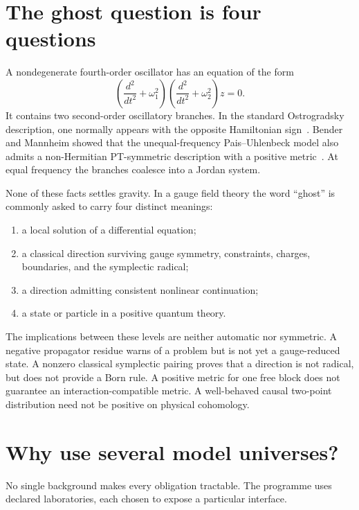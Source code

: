 \documentclass[11pt]{article}
\begin{document}
\section{The ghost question is four questions}

A nondegenerate fourth-order oscillator has an equation of the form
\[
 \left(\frac{d^2}{dt^2}+\omega_1^2\right)
 \left(\frac{d^2}{dt^2}+\omega_2^2\right)z=0.
\]
It contains two second-order oscillatory branches.  In the standard
Ostrogradsky description, one normally appears with the opposite Hamiltonian
sign~\cite{Ostrogradsky,Woodard,PU1950}.  Bender and Mannheim showed that the
unequal-frequency Pais--Uhlenbeck model also admits a non-Hermitian
PT-symmetric description with a positive metric~\cite{BM2008PRL,BM2008PRD}.
At equal frequency the branches coalesce into a Jordan system.

None of these facts settles gravity.  In a gauge field theory the word
``ghost'' is commonly asked to carry four distinct meanings:
\begin{enumerate}
\item a local solution of a differential equation;
\item a classical direction surviving gauge symmetry, constraints, charges,
boundaries, and the symplectic radical;
\item a direction admitting consistent nonlinear continuation;
\item a state or particle in a positive quantum theory.
\end{enumerate}

The implications between these levels are neither automatic nor symmetric.
A negative propagator residue warns of a problem but is not yet a
gauge-reduced state.  A nonzero classical symplectic pairing proves that a
direction is not radical, but does not provide a Born rule.  A positive metric
for one free block does not guarantee an interaction-compatible metric.  A
well-behaved causal two-point distribution need not be positive on physical
cohomology.

\section{Why use several model universes?}

No single background makes every obligation tractable.  The programme uses
declared laboratories, each chosen to expose a particular interface.
\end{document}
